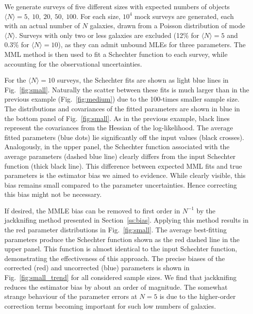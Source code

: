 \documentclass[a4paper,fleqn,usenatbib]{mnras}
\newcommand{\fig}[1]{Fig.~\ref{fig:#1}}
\renewcommand{\ss}[1]{Section~\ref{ss:#1}}
\begin{document}
We generate surveys of five different sizes with expected numbers of objects $\langle N\rangle=5,\ 10,\ 20,\ 50,\ 100$. For each size, $10^4$ mock surveys are generated, each with an actual number of $N$ galaxies, drawn from a Poisson distribution of mode $\langle N\rangle$. Surveys with only two or less galaxies are excluded (12\% for $\langle N\rangle=5$ and 0.3\% for $\langle N\rangle=10$), as they can admit unbound MLEs for three parameters. The MML method is then used to fit a Schechter function to each survey, while accounting for the observational uncertainties.

For  the $\langle N\rangle=10$ surveys, the Schechter fits are shown as light blue lines in \fig{small}. Naturally the scatter between these fits is much larger than in the previous example (\fig{medium}) due to the 100-times smaller sample size. The distributions and covariances of the fitted parameters are shown in blue in the bottom panel of \fig{small}. As in the previous example, black lines represent the covariances from the Hessian of the log-likelihood. The average fitted parameters (blue dots) lie significantly off the input values (black crosses). Analogously, in the upper panel, the Schechter function associated with the average parameters (dashed blue line) clearly differs from the input Schechter function (thick black line). This difference between expected MML fits and true parameters is the estimator bias we aimed to evidence. While clearly visible, this bias remains small compared to the parameter uncertainties. Hence correcting this bias might not be necessary.

If desired, the MMLE bias can be removed to first order in $N^{-1}$ by the jackknifing method presented in \ss{bias}. Applying this method results in the red parameter distributions in \fig{small}. The average best-fitting parameters produce the Schechter function shown as the red dashed line in the upper panel. This function is almost identical to the input Schechter function, demonstrating the effectiveness of this approach. The precise biases of the corrected (red) and uncorrected (blue) parameters is shown in \fig{small_trend} for all considered sample sizes. We find that jackknifing reduces the estimator bias by about an order of magnitude. The somewhat strange behaviour of the parameter errors at $N=5$ is due to the higher-order correction terms becoming important for such low numbers of galaxies.

\end{document}
